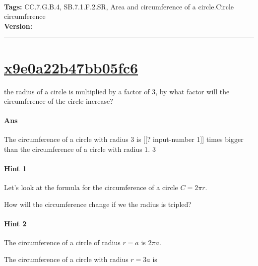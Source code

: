 \documentclass[twocolumn,10pt]{article}
\newcommand{\blue}[1]{{\color{Blue}#1}}
\newcommand{\green}[1]{{\color{Green}#1}}
\begin{document}
\DIFaddbegin \paragraph{}

\DIFadd{$\qquad \dfrac{\blue{C}}{\green{d}}=\pi$. 
}



\DIFaddend \medskip
\noindent
\textbf{Tags:} {\footnotesize CC.7.G.B.4, SB.7.1.F.2.SR, Area and circumference of a circle.Circle circumference}\\
\textbf{Version:} \DIFdelbegin {}\DIFdelend \DIFaddbegin {}\DIFaddend \smallskip\hrule





\section{\href{https://www.khanacademy.org/devadmin/content/items/x9e0a22b47bb05fc6}{x9e0a22b47bb05fc6}}

\noindent
\DIFdelbegin {}\DIFdelend \DIFaddbegin {}\DIFaddend the radius of a circle is multiplied by a factor of $3$, by what factor will the circumference of the circle increase?

\paragraph{Ans} \DIFaddbegin {}

\DIFaddend The circumference of a circle with radius $3$ is [[? input-number 1]] times bigger than the circumference of a circle with radius $1$.  3

\paragraph{Hint 1}Let's look at the formula for the circumference of a circle $C=2\pi r$.  

How will the circumference change if we the radius is tripled?

\paragraph{Hint 2}The circumference of a circle of radius $r=a$ is $2\pi a$.

The circumference of a circle with radius $r=3a$ is 
\end{document}
